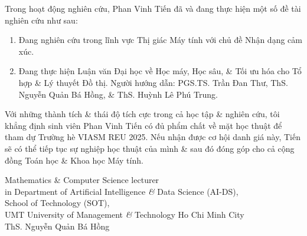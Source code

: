 \documentclass[11pt]{article}
\begin{document}
Trong hoạt động nghiên cứu, {\sc Phan Vinh Tiến} đã và đang thực hiện một số đề tài nghiên cứu như sau:
\begin{enumerate}
    \item Đang nghiên cứu trong lĩnh vực Thị giác Máy tính với chủ đề Nhận dạng cảm xúc.
    
    \item Đang thực hiện Luận văn Đại học về Học máy, Học sâu, \& Tối ưu hóa cho Tổ hợp \& Lý thuyết Đồ thị. Người hướng dẫn: PGS.TS. {\sc Trần Đan Thư}, ThS. {\sc Nguyễn Quản Bá Hồng}, \& ThS. {\sc Huỳnh Lê Phú Trung}.
\end{enumerate}
Với những thành tích \& thái độ tích cực trong cả học tập \& nghiên cứu, tôi khẳng định sinh viên {\sc Phan Vinh Tiến} có đủ phẩm chất về mặt học thuật để tham dự Trường hè VIASM REU 2025. Nếu nhận được cơ hội danh giá này, {\sc Tiến} sẽ có thể tiếp tục sự nghiệp học thuật của mình \& sau đó đóng góp cho cả cộng đồng Toán học \& Khoa học Máy tính.


\begin{flushright}    
    Mathematics \& Computer Science lecturer\\in Department of Artificial Intelligence {\it\&} Data Science (AI-DS),\\School of Technology (SOT),\\UMT University of Management {\it\&} Technology Ho Chi Minh City\\
    \vspace{2cm}
    ThS. {\sc Nguyễn Quản Bá Hồng}
\end{flushright}


\printbibliography[heading=bibintoc]
\end{document}
